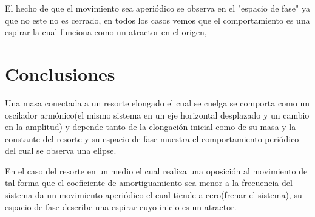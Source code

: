 \documentclass[12pt,a4paper]{article}
\begin{document}
El hecho de que el movimiento sea aperiódico se observa en el "espacio de fase" ya que no este no es cerrado, en todos los casos vemos que el comportamiento es una espirar la cual funciona como un atractor en el origen, 

\section*{Conclusiones}

Una masa conectada a un resorte elongado el cual se cuelga se comporta como un oscilador armónico(el mismo sistema en un eje horizontal desplazado y un cambio en la amplitud) y depende tanto de la elongación inicial como de su masa y la constante del resorte y su espacio de fase muestra el comportamiento periódico del cual se observa una elipse.

En el caso del resorte en un medio el cual realiza una oposición al movimiento de tal forma que el coeficiente de amortiguamiento sea menor a la frecuencia del sistema da un movimiento aperiódico el cual tiende a cero(frenar el sistema), su espacio de fase describe una espirar cuyo inicio es un atractor. 



\end{document}
